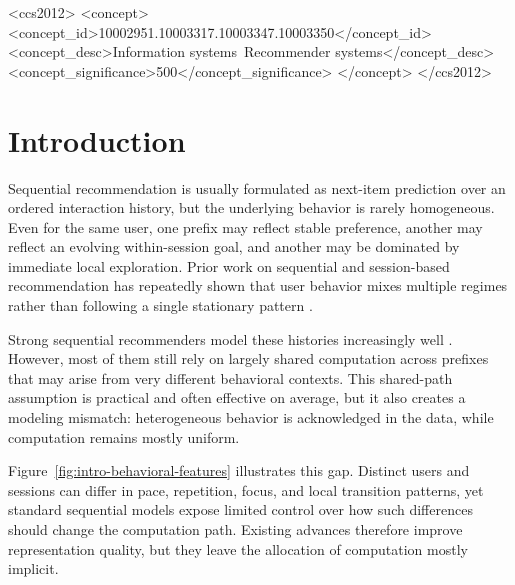 \documentclass[sigconf,review,anonymous]{acmart}
\begin{document}
\begin{CCSXML}
<ccs2012>
 <concept>
  <concept_id>10002951.10003317.10003347.10003350</concept_id>
  <concept_desc>Information systems~Recommender systems</concept_desc>
  <concept_significance>500</concept_significance>
 </concept>
</ccs2012>
\end{CCSXML}



\maketitle

\section{Introduction}
Sequential recommendation is usually formulated as next-item prediction over an ordered interaction history, but the underlying behavior is rarely homogeneous. Even for the same user, one prefix may reflect stable preference, another may reflect an evolving within-session goal, and another may be dominated by immediate local exploration. Prior work on sequential and session-based recommendation has repeatedly shown that user behavior mixes multiple regimes rather than following a single stationary pattern \cite{wang2019seqsurvey,wang2021sessionsurvey}.

Strong sequential recommenders model these histories increasingly well \cite{hidasi2016gru4rec,kang2018sasrec,li2020tisasrec,qiu2022duorec,shin2024bsarec,liu2025sigma}. However, most of them still rely on largely shared computation across prefixes that may arise from very different behavioral contexts. This shared-path assumption is practical and often effective on average, but it also creates a modeling mismatch: heterogeneous behavior is acknowledged in the data, while computation remains mostly uniform.

Figure~\ref{fig:intro-behavioral-features} illustrates this gap. Distinct users and sessions can differ in pace, repetition, focus, and local transition patterns, yet standard sequential models expose limited control over how such differences should change the computation path. Existing advances therefore improve representation quality, but they leave the allocation of computation mostly implicit.
\end{document}
